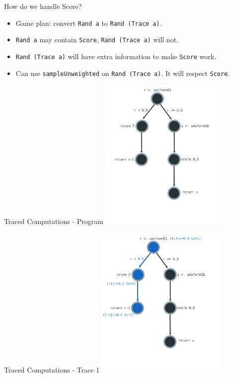 \documentclass{beamer}
\newcommand{\hsmint}[1]{\texttt{#1}}
\begin{document}
\begin{frame}[fragile]{How do we handle Score?}
    \begin{itemize}
        \item Game plan: convert \hsmint{Rand a} to \hsmint{Rand (Trace a)}.
        \item \hsmint{Rand a} may contain \hsmint{Score}, \hsmint{Rand (Trace a)} will not.
        \item \hsmint{Rand (Trace a)} will have extra information to make \hsmint{Score} work.
        \item Can use \hsmint{sampleUnweighted} on \hsmint{Rand (Trace a)}. It will respect \hsmint{Score}.
\end{itemize}
\end{frame}

\begin{frame}[fragile]{Traced Computations - Program}
\includegraphics[height=280px]{res/program-1.pdf}
\end{frame}

\begin{frame}[fragile]{Traced Computations - Trace 1}
\includegraphics[height=280px]{res/program-2.pdf}
\end{frame}
\end{document}
